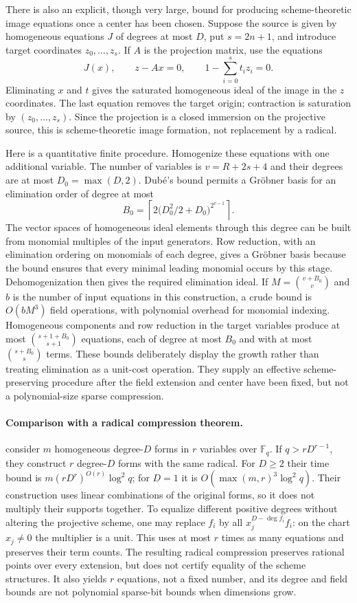 There is also an explicit, though very large, bound for producing
scheme-theoretic image equations once a center has been chosen.
Suppose the source is given by homogeneous equations $J$ of degrees
at most $D$, put $s=2n+1$, and introduce target coordinates
$z_0,\ldots,z_s$. If $A$ is the projection matrix, use the equations
\[
 J(x),\qquad z-Ax=0,\qquad
 1-\sum_{i=0}^s t_i z_i=0.
\]
Eliminating $x$ and $t$ gives the saturated homogeneous ideal of the
image in the $z$ coordinates. The last equation removes the target
origin; contraction is saturation by $(z_0,\ldots,z_s)$. Since the
projection is a closed immersion on the projective source, this is
scheme-theoretic image formation, not replacement by a radical.

Here is a quantitative finite procedure. Homogenize these equations
with one additional variable. The number of variables is
$v=R+2s+4$ and their degrees are at most $D_0=\max(D,2)$.
Dub\'e's bound \citep[Theorem~8.2]{sp-dube} permits a Gr\"obner basis
for an elimination order of degree at most
\[
 B_0=\left\lceil2\bigl(D_0^2/2+D_0\bigr)^{2^{v-1}}\right\rceil.
\]
The vector spaces of homogeneous ideal elements through this degree
can be built from monomial multiples of the input generators.
Row reduction, with an elimination ordering on monomials of each
degree, gives a Gr\"obner basis because the bound ensures that every
minimal leading monomial occurs by this stage. Dehomogenization then
gives the required elimination ideal. If $M=\binom{v+B_0}{v}$ and
$b$ is the number of input equations in this construction, a crude
bound is $O(bM^3)$ field operations, with polynomial overhead for
monomial indexing. Homogeneous components and row reduction in the
target variables produce at most $\binom{s+1+B_0}{s+1}$ equations,
each of degree at most $B_0$ and with at most $\binom{s+B_0}{s}$ terms.
These bounds deliberately display the growth rather than treating
elimination as a unit-cost operation. They supply an effective
scheme-preserving procedure after the field extension and center have
been fixed, but not a polynomial-size sparse compression.

\paragraph{Comparison with a radical compression theorem.}
\citet[Theorem~3.2]{sp-crw} consider $m$ homogeneous degree-$D$ forms
in $r$ variables over $\mathbb F_q$. If $q>rD^{r-1}$, they construct
$r$ degree-$D$ forms with the same radical. For $D\geq2$ their time
bound is $m(rD^r)^{O(r)}\log^2q$; for $D=1$ it is
$O(\max(m,r)^3\log^2q)$. Their construction uses linear combinations
of the original forms, so it does not multiply their supports together.
To equalize different positive degrees without altering the projective
scheme, one may replace $f_i$ by all $x_j^{D-\deg f_i}f_i$:
on the chart $x_j\ne0$ the multiplier is a unit. This uses at most
$r$ times as many equations and preserves their term counts.
The resulting radical compression preserves rational points over every
extension, but does not certify equality of the scheme structures.
It also yields $r$ equations, not a fixed number, and its degree and
field bounds are not polynomial sparse-bit bounds when dimensions grow.

